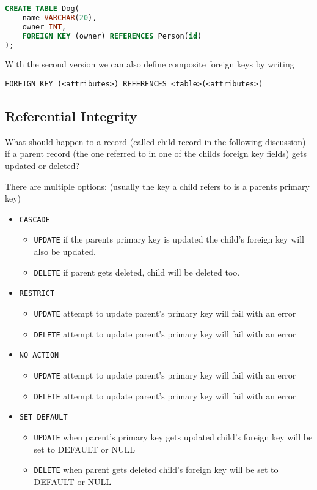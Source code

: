 \documentclass{sciposter}
\renewcommand{\t}[1]{\texttt{#1}}
\begin{document}
\begin{multicols}{3}
\begin{lstlisting}[language=SQL]
CREATE TABLE Dog(
	name VARCHAR(20),
	owner INT,
	FOREIGN KEY (owner) REFERENCES Person(id)
);
\end{lstlisting}

With the second version we can also define composite foreign keys by writing

\t{FOREIGN KEY (<attributes>) REFERENCES <table>(<attributes>)}

\subsection*{Referential Integrity}

What should happen to a record (called child record in the following discussion) if a parent record (the one referred to in one of the childs foreign key fields) gets updated or deleted?

There are multiple options: (usually the key a child refers to is a parents primary key)

\begin{itemize}
	\item \t{CASCADE}
	\begin{itemize} 
		\item \t{UPDATE} if the parents primary key is updated the child's foreign key will also be updated.
		\item \t{DELETE} if parent gets deleted, child will be deleted too.
	\end{itemize}
	\item \t{RESTRICT}
	\begin{itemize} 
		\item \t{UPDATE} attempt to update parent's primary key will fail with an error
		\item \t{DELETE} attempt to update parent's primary key will fail with an error
	\end{itemize}
	\item \t{NO ACTION}
	\begin{itemize} 
		\item \t{UPDATE} attempt to update parent's primary key will fail with an error
		\item \t{DELETE} attempt to update parent's primary key will fail with an error
	\end{itemize}
	\item \t{SET DEFAULT}
	\begin{itemize} 
		\item \t{UPDATE} when parent's primary key gets updated child's foreign key will be set to DEFAULT or NULL
		\item \t{DELETE} when parent gets deleted child's foreign key will be set to DEFAULT or NULL
	\end{itemize}
\end{itemize}


\end{multicols}
\end{document}
